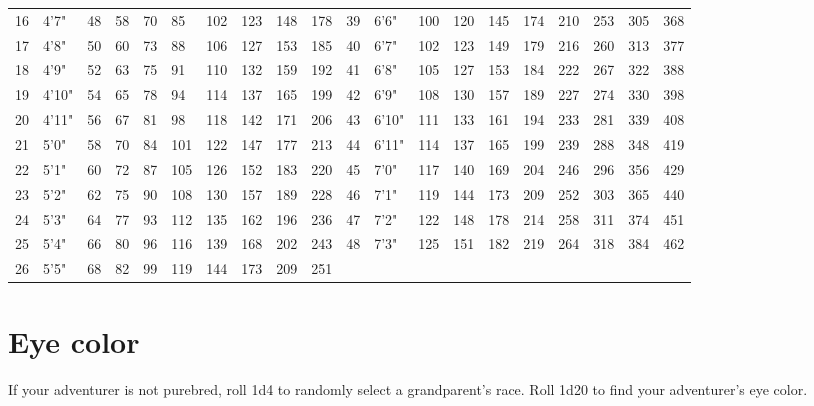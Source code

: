 \begin{normbox}
\begin{tabularx}{\linewidth}{@{} X X X X X X X X X X | X X X X X X X X X X}
16 & 4'7" & 48 & 58 & 70 & 85 & 102 & 123 & 148 & 178 & 39 & 6'6" & 100 & 120 & 145 & 174 & 210 & 253 & 305 & 368\\
17 & 4'8" & 50 & 60 & 73 & 88 & 106 & 127 & 153 & 185 & 40 & 6'7" & 102 & 123 & 149 & 179 & 216 & 260 & 313 & 377\\
18 & 4'9" & 52 & 63 & 75 & 91 & 110 & 132 & 159 & 192 & 41 & 6'8" & 105 & 127 & 153 & 184 & 222 & 267 & 322 & 388\\
19 & 4'10" & 54 & 65 & 78 & 94 & 114 & 137 & 165 & 199 & 42 & 6'9" & 108 & 130 & 157 & 189 & 227 & 274 & 330 & 398\\
20 & 4'11" & 56 & 67 & 81 & 98 & 118 & 142 & 171 & 206 & 43 & 6'10" & 111 & 133 & 161 & 194 & 233 & 281 & 339 & 408\\
21 & 5'0" & 58 & 70 & 84 & 101 & 122 & 147 & 177 & 213 & 44 & 6'11" & 114 & 137 & 165 & 199 & 239 & 288 & 348 & 419\\
22 & 5'1" & 60 & 72 & 87 & 105 & 126 & 152 & 183 & 220 & 45 & 7'0" & 117 & 140 & 169 & 204 & 246 & 296 & 356 & 429\\
23 & 5'2" & 62 & 75 & 90 & 108 & 130 & 157 & 189 & 228 & 46 & 7'1" & 119 & 144 & 173 & 209 & 252 & 303 & 365 & 440\\
24 & 5'3" & 64 & 77 & 93 & 112 & 135 & 162 & 196 & 236 & 47 & 7'2" & 122 & 148 & 178 & 214 & 258 & 311 & 374 & 451\\
25 & 5'4" & 66 & 80 & 96 & 116 & 139 & 168 & 202 & 243 & 48 & 7'3" & 125 & 151 & 182 & 219 & 264 & 318 & 384 & 462\\
26 & 5'5" & 68 & 82 & 99 & 119 & 144 & 173 & 209 & 251 & 									
\end{tabularx}
\end{normbox}


\normalsize
\section{Eye color}

If your adventurer is not purebred, roll 1d4 to randomly select a grandparent's race. Roll 1d20 to find your adventurer's eye color.

